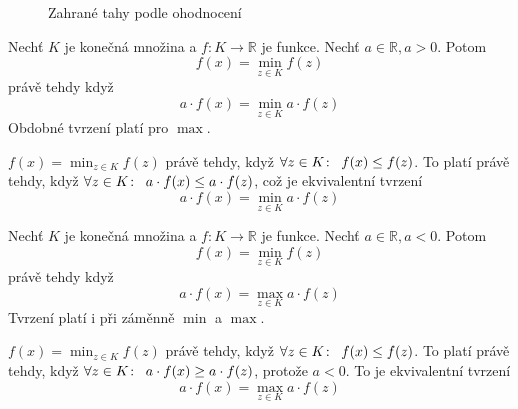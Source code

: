 \begin{figure}[h!]
    \centering
    \caption{Zahrané tahy podle ohodnocení}
    \label{fig23start12}
\end{figure}



\begin{lemma}
    Nechť $K$ je konečná množina a $f \colon K \to \mathbb{R}$ je funkce. Nechť $a \in \mathbb{R}, a > 0$. Potom 
    \[f(x) = \min_{z \in K} f(z)\]
    právě tehdy když
    \[a\cdot f(x) = \min_{z \in K} a\cdot f(z)\]
    Obdobné tvrzení platí pro $\max$.
\end{lemma}
\begin{dukaz}
    $f(x) = \min_{z \in K} f(z)$ právě tehdy, když $\forall z \in K\colon \hspace{5px} f(x) \leq f(z)$. To platí právě tehdy, když $\forall z \in K\colon \hspace{5px} a \cdot f(x) \leq a\cdot f(z)$, což je ekvivalentní tvrzení \[a\cdot f(x) = \min_{z \in K} a\cdot f(z)\]
\end{dukaz}


\begin{tvrz}
    Nechť $K$ je konečná množina a $f \colon K \to \mathbb{R}$ je funkce. Nechť $a \in \mathbb{R}, a < 0$. Potom 
    \[f(x) = \min_{z \in K} f(z)\]
    právě tehdy když
    \[a\cdot f(x) = \max_{z \in K} a\cdot f(z)\]
    Tvrzení platí i při záměnně $\min$ a $\max$.
\end{tvrz}
\begin{dukaz}
    $f(x) = \min_{z \in K} f(z)$ právě tehdy, když $\forall z \in K\colon \hspace{5px} f(x) \leq f(z)$. To platí právě tehdy, když $\forall z \in K\colon \hspace{5px} a \cdot f(x) \geq a\cdot f(z)$, protože $a<0$. To je ekvivalentní tvrzení \[a\cdot f(x) = \max_{z \in K} a\cdot f(z)\]
\end{dukaz}


